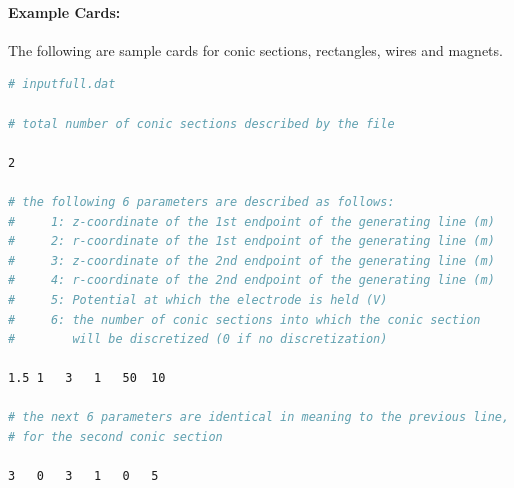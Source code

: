 \documentclass[11pt,a4paper,oneside]{article}
\begin{document}
\paragraph{Example Cards:} The following are sample cards for conic sections, rectangles, wires and magnets.  
%
\begin{lstlisting}[language=sh]
# inputfull.dat

# total number of conic sections described by the file

2

# the following 6 parameters are described as follows:
#     1: z-coordinate of the 1st endpoint of the generating line (m)
#     2: r-coordinate of the 1st endpoint of the generating line (m)
#     3: z-coordinate of the 2nd endpoint of the generating line (m)
#     4: r-coordinate of the 2nd endpoint of the generating line (m)
#     5: Potential at which the electrode is held (V)
#     6: the number of conic sections into which the conic section
#        will be discretized (0 if no discretization)

1.5	1	3	1	50	10

# the next 6 parameters are identical in meaning to the previous line,
# for the second conic section

3   0	3	1	0	5
\end{lstlisting}
%
\end{document}
